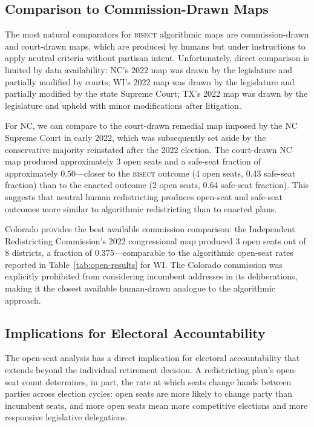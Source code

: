 \label{sec:discussion}

\subsection{Comparison to Commission-Drawn Maps}

The most natural comparators for \textsc{bisect} algorithmic maps are commission-drawn
and court-drawn maps, which are produced by humans but under instructions to apply
neutral criteria without partisan intent. Unfortunately, direct comparison is limited
by data availability: NC's 2022 map was drawn by the legislature and partially modified
by courts; WI's 2022 map was drawn by the legislature and partially modified by the
state Supreme Court; TX's 2022 map was drawn by the legislature and upheld with minor
modifications after litigation.

For NC, we can compare to the court-drawn remedial map imposed by the NC Supreme Court
in early 2022, which was subsequently set aside by the conservative majority reinstated
after the 2022 election. The court-drawn NC map produced approximately 3 open seats
and a safe-seat fraction of approximately 0.50---closer to the \textsc{bisect} outcome
(4 open seats, 0.43 safe-seat fraction) than to the enacted outcome (2 open seats, 0.64
safe-seat fraction). This suggests that neutral human redistricting produces open-seat
and safe-seat outcomes more similar to algorithmic redistricting than to enacted plans.

Colorado provides the best available commission comparison: the Independent
Redistricting Commission's 2022 congressional map produced 3 open seats out of 8
districts, a fraction of 0.375---comparable to the algorithmic open-seat rates reported
in Table~\ref{tab:open-results} for WI. The Colorado commission was explicitly prohibited
from considering incumbent addresses in its deliberations, making it the closest
available human-drawn analogue to the algorithmic approach.

\subsection{Implications for Electoral Accountability}

The open-seat analysis has a direct implication for electoral accountability that
extends beyond the individual retirement decision. A redistricting plan's open-seat
count determines, in part, the rate at which seats change hands between parties across
election cycles: open seats are more likely to change party than incumbent seats, and
more open seats mean more competitive elections and more responsive legislative
delegations.

